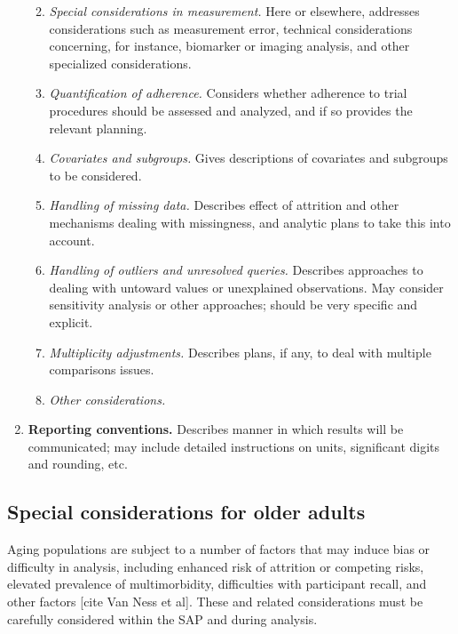 \documentclass[]{book}
\providecommand{\tightlist}{%
  \setlength{\itemsep}{0pt}\setlength{\parskip}{0pt}}
\theoremstyle{definition}
\theoremstyle{definition}
\theoremstyle{definition}
\theoremstyle{remark}
\begin{document}
\begin{enumerate}
  \begin{enumerate}
  \def\labelenumii{\alph{enumii}.}
  \tightlist
  \item
    \emph{Special considerations in measurement.} Here or elsewhere,
    addresses considerations such as measurement error, technical
    considerations concerning, for instance, biomarker or imaging
    analysis, and other specialized considerations.
  \item
    \emph{Quantification of adherence.} Considers whether adherence to
    trial procedures should be assessed and analyzed, and if so provides
    the relevant planning.
  \item
    \emph{Covariates and subgroups.} Gives descriptions of covariates
    and subgroups to be considered.
  \item
    \emph{Handling of missing data.} Describes effect of attrition and
    other mechanisms dealing with missingness, and analytic plans to
    take this into account.
  \item
    \emph{Handling of outliers and unresolved queries.} Describes
    approaches to dealing with untoward values or unexplained
    observations. May consider sensitivity analysis or other approaches;
    should be very specific and explicit.
  \item
    \emph{Multiplicity adjustments.} Describes plans, if any, to deal
    with multiple comparisons issues.
  \item
    \emph{Other considerations.}
  \end{enumerate}
\item
  \textbf{Reporting conventions.} Describes manner in which results will
  be communicated; may include detailed instructions on units,
  significant digits and rounding, etc.
\end{enumerate}

\subsection{Special considerations for older
adults}\label{special-considerations-for-older-adults-1}

Aging populations are subject to a number of factors that may induce
bias or difficulty in analysis, including enhanced risk of attrition or
competing risks, elevated prevalence of multimorbidity, difficulties
with participant recall, and other factors {[}cite Van Ness et al{]}.
These and related considerations must be carefully considered within the
SAP and during analysis.
\end{document}
